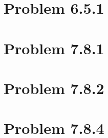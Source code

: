\documentclass[11pt]{wacomepd}
\begin{document}
\section{Problem 6.5.1}

\section{Problem 7.8.1}

\section{Problem 7.8.2}

\section{Problem 7.8.4}
\end{document}
